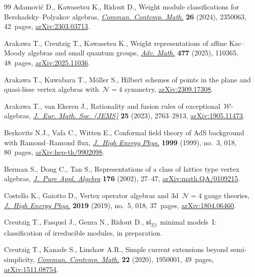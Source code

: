 \documentclass[10pt,a4paper]{amsart}
\numberwithin{equation}{section}
\begin{document}
\begin{thebibliography}{99}
Adamovi\'c D., Kawasetsu K., Ridout D., Weight module classifications for
 {B}ershadsky--{P}olyakov algebras,
 \href{https://doi.org/10.1142/S0219199723500633}{\textit{Commun. Contemp.
 Math.}} \textbf{26} (2024), 2350063, 42~pages,
 \href{http://arxiv.org/abs/2303.03713}{arXiv:2303.03713}.

Arakawa T., Creutzig T., Kawasetsu K., Weight representations of affine
 {K}ac--{M}oody algebras and small quantum groups,
 \href{https://doi.org/10.1016/j.aim.2025.110365}{\textit{Adv. Math.}}
 \textbf{477} (2025), 110365, 48~pages,
 \href{http://arxiv.org/abs/2025.11036}{arXiv:2025.11036}.

Arakawa T., Kuwabara T., M\"oller S., Hilbert schemes of points in the plane
 and quasi-lisse vertex algebras with~{$\mathcal{N}=4$} symmetry,
 \href{http://arxiv.org/abs/2309.17308}{arXiv:2309.17308}.

Arakawa T., van Ekeren J., Rationality and fusion rules of
 exceptional~{$\mathcal {W}$}-algebras,
 \href{https://doi.org/10.4171/jems/1250}{\textit{J.~Eur. Math. Soc. (JEMS)}}
 \textbf{25} (2023), 2763--2813,
 \href{http://arxiv.org/abs/1905.11473}{arXiv:1905.11473}.

Berkovits N.J., Vafa C., Witten E., Conformal field theory of {A}d{S}
 background with {R}amond--{R}amond flux,
 \href{https://doi.org/10.1088/1126-6708/1999/03/018}{\textit{J.~High Energy
 Phys.}} \textbf{1999} (1999), no.~3, 018, 80~pages,
 \href{http://arxiv.org/abs/hep-th/9902098}{arXiv:hep-th/9902098}.

Berman S., Dong C., Tan S., Representations of a class of lattice type vertex
 algebras,
 \href{https://doi.org/10.1016/S0022-4049(02)00053-1}{\textit{J.~Pure Appl.
 Algebra}} \textbf{176} (2002), 27--47,
 \href{http://arxiv.org/abs/math.QA/0109215}{arXiv:math.QA/0109215}.

Costello K., Gaiotto D., Vertex operator algebras and 3d~{$\mathcal N=4$}
 gauge theories,
 \href{https://doi.org/10.1007/jhep05(2019)018}{\textit{J.~High Energy Phys.}}
 \textbf{2019} (2019), no.~5, 018, 37~pages,
 \href{http://arxiv.org/abs/1804.06460}{arXiv:1804.06460}.

Creutzig T., Fasquel J., Genra N., Ridout D., $\mathfrak{sl}_{2\vert1}$ minimal
 models~{I}: classification of irreducible modules, {i}n preparation.

Creutzig T., Kanade S., Linshaw A.R., Simple current extensions beyond
 semi-simplicity,
 \href{https://doi.org/10.1142/S0219199719500019}{\textit{Commun. Contemp.
 Math.}} \textbf{22} (2020), 1950001, 49~pages,
 \href{http://arxiv.org/abs/1511.08754}{arXiv:1511.08754}.


\end{thebibliography}
\end{document}
